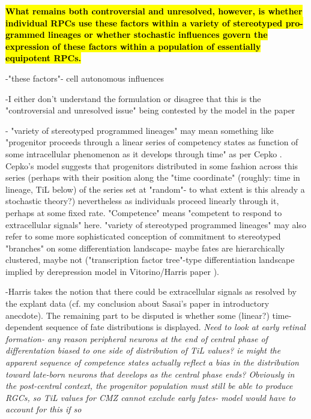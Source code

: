 \documentclass{ut-thesis}
\begin{document}
\bigskip

\textbf{\hl{What remains both
controversial and unresolved, however, is whether individual
RPCs use these factors within a variety of stereotyped pro-
grammed lineages or whether stochastic influences govern the
expression of these factors within a population of essentially
equipotent RPCs. }}

\bigskip

-"these factors"- cell autonomous influences

-I either don't understand the formulation or disagree that this is the "controversial and unresolved issue" being contested by the model in the paper

- "variety of stereotyped programmed lineages" may mean something like "progenitor proceeds through a linear series of competency states as function of some intracellular phenomenon as it develops through time" as per Cepko \cite{Cepko1996}. Cepko's model suggests that progenitors distributed in some fashion across this series (perhaps with their position along the "time coordinate" (roughly: time in lineage, TiL below) of the series set at "random"- to what extent is this already a stochastic theory?) nevertheless as individuals proceed linearly through it, perhaps at some fixed rate. "Competence" means "competent to respond to extracellular signals" here. "variety of stereotyped programmed lineages" may also refer to some more sophisticated conception of commitment to stereotyped "branches" on some differentiation landscape- maybe fates are hierarchically clustered, maybe not ("transcription factor tree"-type differentiation landscape implied by derepression model in Vitorino/Harris paper \cite{Vitorino2009}).

-Harris takes the notion that there could be extracellular signals as resolved by the explant data (cf. my conclusion about Sasai's paper in introductory anecdote). The remaining part to be disputed is whether some (linear?) time-dependent sequence of fate distributions is displayed. \textit{Need to look at early retinal formation- any reason peripheral neurons at the end of central phase of differentation biased to one side of distribution of TiL values? ie might the apparent sequence of competence states actually reflect a bias in the distribution toward late-born neurons that develops as the central phase ends? Obviously in the post-central context, the progenitor population must still be able to produce RGCs, so TiL values for CMZ cannot exclude early fates- model would have to account for this if so}
\end{document}
